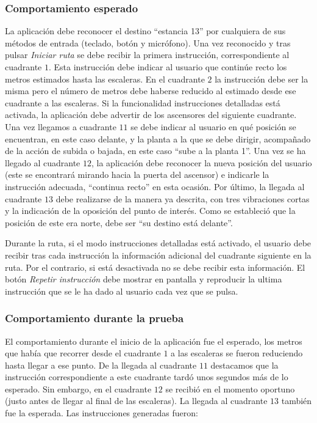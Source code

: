 \subsubsection*{Comportamiento esperado}

La aplicación debe reconocer el destino ``estancia 13'' por cualquiera de sus métodos de entrada (teclado, botón y micrófono). Una vez reconocido y tras pulsar \textit{Iniciar ruta} se debe recibir la primera instrucción, correspondiente al cuadrante $1$. Esta instrucción debe indicar al usuario que continúe recto los metros estimados hasta las escaleras. En el cuadrante $2$ la instrucción debe ser la misma pero el número de metros debe haberse reducido al estimado desde ese cuadrante a las escaleras. Si la funcionalidad instrucciones detalladas está activada, la aplicación debe advertir de los ascensores del siguiente cuadrante. Una vez llegamos a cuadrante $11$ se debe indicar al usuario en qué posición se encuentran, en este caso delante, y la planta a la que se debe dirigir, acompañado de la acción de subida o bajada, en este caso ``sube a la planta 1''. Una vez se ha llegado al cuadrante $12$, la aplicación debe reconocer la nueva posición del usuario (este se encontrará mirando hacia la puerta del ascensor) e indicarle la instrucción adecuada, ``continua recto'' en esta ocasión. Por último, la llegada al cuadrante $13$ debe realizarse de la manera ya descrita, con tres vibraciones cortas y la indicación de la oposición del punto de interés. Como se estableció que la posición de este era norte, debe ser ``su destino está delante''. 

Durante la ruta, si el modo instrucciones detalladas está activado, el usuario debe recibir tras cada instrucción la información adicional del cuadrante siguiente en la ruta. Por el contrario, si está desactivada no se debe recibir esta información. El botón \textit{Repetir instrucción} debe mostrar en pantalla y reproducir la ultima instrucción que se le ha dado al usuario cada vez que se pulsa. 


\subsubsection*{Comportamiento durante la prueba}

El comportamiento durante el inicio de la aplicación fue el esperado, los metros que había que recorrer desde el cuadrante $1$ a las escaleras se fueron reduciendo hasta llegar a ese punto. De la llegada al cuadrante $11$ destacamos que la instrucción correspondiente a este cuadrante tardó unos segundos más de lo esperado. Sin embargo, en el cuadrante $12$ se recibió en el momento oportuno (justo antes de llegar al final de las escaleras). La llegada al cuadrante $13$ también fue la esperada. Las instrucciones generadas fueron:

